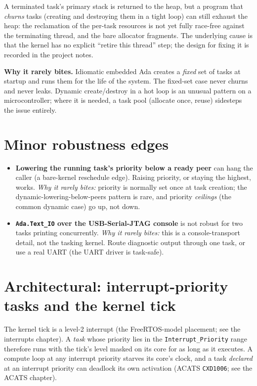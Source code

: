 A terminated task's primary stack is returned to the heap, but a program that
\emph{churns} tasks (creating and destroying them in a tight loop) can still
exhaust the heap: the reclamation of the per-task resources is not yet fully
race-free against the terminating thread, and the bare allocator fragments. The
underlying cause is that the kernel has no explicit ``retire this thread'' step;
the design for fixing it is recorded in the project notes.

\textbf{Why it rarely bites.} Idiomatic embedded Ada creates a \emph{fixed} set
of tasks at startup and runs them for the life of the system. The fixed-set
case never churns and never leaks. Dynamic create/destroy in a hot loop is an
unusual pattern on a microcontroller; where it is needed, a task pool (allocate
once, reuse) sidesteps the issue entirely.

\section{Minor robustness edges}

\begin{itemize}
  \item \textbf{Lowering the running task's priority below a ready peer} can hang
        the caller (a bare-kernel reschedule edge). Raising priority, or staying
        the highest, works. \emph{Why it rarely bites:} priority is normally set
        once at task creation; the dynamic-lowering-below-peers pattern is rare,
        and priority \emph{ceilings} (the common dynamic case) go up, not down.
  \item \textbf{\texttt{Ada.Text\_IO} over the USB-Serial-JTAG console} is not
        robust for two tasks printing concurrently. \emph{Why it rarely bites:}
        this is a console-transport detail, not the tasking kernel. Route
        diagnostic output through one task, or use a real UART (the UART driver
        is task-safe).
\end{itemize}

\section{Architectural: interrupt-priority tasks and the kernel tick}

The kernel tick is a level-2 interrupt (the FreeRTOS-model placement; see the
interrupts chapter). A \emph{task} whose priority lies in the
\texttt{Interrupt\_Priority} range therefore runs with the tick's level masked
on its core for as long as it executes. A compute loop at any interrupt
priority starves its core's clock, and a task \emph{declared} at an interrupt
priority can deadlock its own activation (ACATS \texttt{CXD1006}; see the
ACATS chapter).

